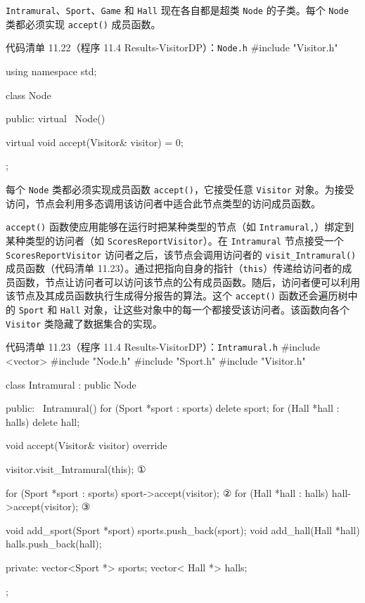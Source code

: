 \texttt{Intramural}、\texttt{Sport}、\texttt{Game} 和 \texttt{Hall} 现在各自都是超类 \texttt{Node} 的子类。每个 \texttt{Node} 类都必须实现 \texttt{accept()} 成员函数。

\begin{codeboxt}{代码清单 11.22（程序 11.4 Results-VisitorDP）：\texttt{Node.h}}
#include "Visitor.h"

using namespace std;

class Node
{
public:
    virtual ~Node() {}

    virtual void accept(Visitor& visitor) = 0;
};
\end{codeboxt}

每个 \texttt{Node} 类都必须实现成员函数 \texttt{accept()}，它接受任意 \texttt{Visitor} 对象。为接受访问，节点会利用多态调用该访问者中适合此节点类型的访问成员函数。

\texttt{accept()} 函数使应用能够在运行时把某种类型的节点（如 \texttt{Intramural,\allowbreak{}}）绑定到某种类型的访问者（如 \texttt{Scores\allowbreak{}Report\allowbreak{}Visitor}）。在 \texttt{Intramural} 节点接受一个 \texttt{Scores\allowbreak{}Report\allowbreak{}Visitor} 访问者之后，该节点会调用访问者的 \texttt{visit\_\allowbreak{}Intramural(\allowbreak{})\allowbreak{}} 成员函数（代码清单 11.23）。通过把指向自身的指针（\texttt{this}）传递给访问者的成员函数，节点让访问者可以访问该节点的公有成员函数。随后，访问者便可以利用该节点及其成员函数执行生成得分报告的算法。这个 \texttt{accept()} 函数还会遍历树中的 \texttt{Sport} 和 \texttt{Hall} 对象，让这些对象中的每一个都接受该访问者。该函数向各个 \texttt{Visitor} 类隐藏了数据集合的实现。

\begin{codeboxt}{代码清单 11.23（程序 11.4 Results-VisitorDP）：\texttt{Intramural.\allowbreak{}h}}
#include <vector>
#include "Node.h"
#include "Sport.h"
#include "Visitor.h"

class Intramural : public Node
{
public:
    ~Intramural()
    {
        for (Sport *sport : sports) delete sport;
        for (Hall  *hall  : halls)  delete hall;
    }

    void accept(Visitor& visitor) override
    {
        visitor.visit_Intramural(this);                          ①

        for (Sport *sport : sports) sport->accept(visitor);      ②
        for (Hall  *hall  : halls)   hall->accept(visitor);      ③
    }

    void add_sport(Sport *sport) { sports.push_back(sport); }
    void add_hall(Hall *hall)    { halls.push_back(hall); }

private:
    vector<Sport *> sports;
    vector< Hall *> halls;
};
\end{codeboxt}
\par
{}\par
{}\par

